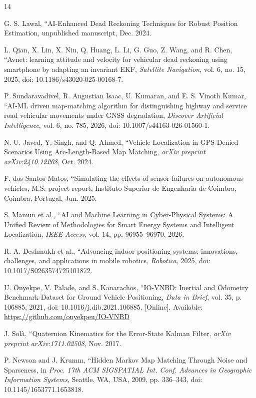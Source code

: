 \documentclass[conference]{IEEEtran}
\begin{document}
\begin{thebibliography}{14}
\setlength{\itemsep}{1pt plus 1pt}
\setlength{\parskip}{0pt}
\footnotesize

 G. S. Lawal, ``AI-Enhanced Dead Reckoning Techniques for Robust Position Estimation, unpublished manuscript, Dec. 2024.

 L. Qian, X. Lin, X. Niu, Q. Huang, L. Li, G. Guo, Z. Wang, and R. Chen, ``Avnet: learning attitude and velocity for vehicular dead reckoning using smartphone by adapting an invariant EKF, \emph{Satellite Navigation}, vol. 6, no. 15, 2025, doi: 10.1186/s43020-025-00168-7.

 P. Sundaravadivel, R. Augustian Isaac, U. Kumaran, and E. S. Vinoth Kumar, ``AI-ML driven map-matching algorithm for distinguishing highway and service road vehicular movements under GNSS degradation, \emph{Discover Artificial Intelligence}, vol. 6, no. 785, 2026, doi: 10.1007/s44163-026-01560-1.

 N. U. Javed, Y. Singh, and Q. Ahmed, ``Vehicle Localization in GPS-Denied Scenarios Using Arc-Length-Based Map Matching, \emph{arXiv preprint arXiv:2410.12208}, Oct. 2024.

 F. dos Santos Matos, ``Simulating the effects of sensor failures on autonomous vehicles, M.S. project report, Instituto Superior de Engenharia de Coimbra, Coimbra, Portugal, Jun. 2025.

 S. Mamun et al., ``AI and Machine Learning in Cyber-Physical Systems: A Unified Review of Methodologies for Smart Energy Systems and Intelligent Localization, \emph{IEEE Access}, vol. 14, pp. 96955--96970, 2026.

 R. A. Deshmukh et al., ``Advancing indoor positioning systems: innovations, challenges, and applications in mobile robotics, \emph{Robotica}, 2025, doi: 10.1017/S0263574725101872.

 U. Onyekpe, V. Palade, and S. Kanarachos, ``IO-VNBD: Inertial and Odometry Benchmark Dataset for Ground Vehicle Positioning, \emph{Data in Brief}, vol. 35, p. 106885, 2021, doi: 10.1016/j.dib.2021.106885. [Online]. Available: \url{https://github.com/onyekpeu/IO-VNBD}

 J. Solà, ``Quaternion Kinematics for the Error-State Kalman Filter, \emph{arXiv preprint arXiv:1711.02508}, Nov. 2017.

 P. Newson and J. Krumm, ``Hidden Markov Map Matching Through Noise and Sparseness, in \emph{Proc. 17th ACM SIGSPATIAL Int. Conf. Advances in Geographic Information Systems}, Seattle, WA, USA, 2009, pp. 336--343, doi: 10.1145/1653771.1653818.


\end{thebibliography}
\end{document}

